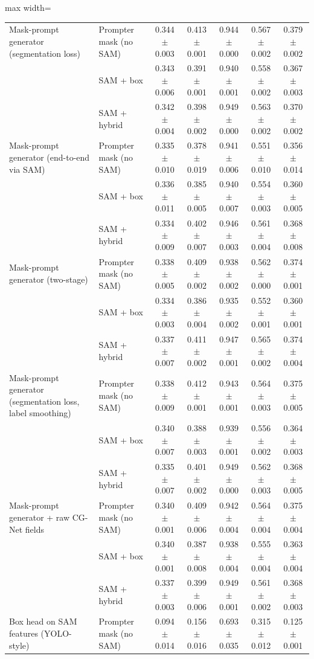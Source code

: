 \begin{table}[htbp]
\begin{adjustbox}{max width=\linewidth}
\begin{tabular}{llccccc}
\midrule
Mask-prompt generator (segmentation loss) & Prompter mask (no SAM) & 0.344$\pm$0.003 & 0.413$\pm$0.001 & 0.944$\pm$0.000 & 0.567$\pm$0.002 & 0.379$\pm$0.002 \\
 & SAM + box & 0.343$\pm$0.006 & 0.391$\pm$0.001 & 0.940$\pm$0.001 & 0.558$\pm$0.002 & 0.367$\pm$0.003 \\
 & SAM + hybrid & 0.342$\pm$0.004 & 0.398$\pm$0.002 & 0.949$\pm$0.000 & 0.563$\pm$0.002 & 0.370$\pm$0.002 \\
\midrule
Mask-prompt generator (end-to-end via SAM) & Prompter mask (no SAM) & 0.335$\pm$0.010 & 0.378$\pm$0.019 & 0.941$\pm$0.006 & 0.551$\pm$0.010 & 0.356$\pm$0.014 \\
 & SAM + box & 0.336$\pm$0.011 & 0.385$\pm$0.005 & 0.940$\pm$0.007 & 0.554$\pm$0.003 & 0.360$\pm$0.005 \\
 & SAM + hybrid & 0.334$\pm$0.009 & 0.402$\pm$0.007 & 0.946$\pm$0.003 & 0.561$\pm$0.004 & 0.368$\pm$0.008 \\
\midrule
Mask-prompt generator (two-stage) & Prompter mask (no SAM) & 0.338$\pm$0.005 & 0.409$\pm$0.002 & 0.938$\pm$0.002 & 0.562$\pm$0.000 & 0.374$\pm$0.001 \\
 & SAM + box & 0.334$\pm$0.003 & 0.386$\pm$0.004 & 0.935$\pm$0.002 & 0.552$\pm$0.001 & 0.360$\pm$0.001 \\
 & SAM + hybrid & 0.337$\pm$0.007 & 0.411$\pm$0.002 & 0.947$\pm$0.001 & 0.565$\pm$0.002 & 0.374$\pm$0.004 \\
\midrule
Mask-prompt generator (segmentation loss, label smoothing) & Prompter mask (no SAM) & 0.338$\pm$0.009 & 0.412$\pm$0.001 & 0.943$\pm$0.001 & 0.564$\pm$0.003 & 0.375$\pm$0.005 \\
 & SAM + box & 0.340$\pm$0.007 & 0.388$\pm$0.003 & 0.939$\pm$0.001 & 0.556$\pm$0.002 & 0.364$\pm$0.003 \\
 & SAM + hybrid & 0.335$\pm$0.007 & 0.401$\pm$0.002 & 0.949$\pm$0.000 & 0.562$\pm$0.003 & 0.368$\pm$0.005 \\
\midrule
Mask-prompt generator + raw CG-Net fields & Prompter mask (no SAM) & 0.340$\pm$0.001 & 0.409$\pm$0.006 & 0.942$\pm$0.004 & 0.564$\pm$0.004 & 0.375$\pm$0.004 \\
 & SAM + box & 0.340$\pm$0.001 & 0.387$\pm$0.008 & 0.938$\pm$0.004 & 0.555$\pm$0.004 & 0.363$\pm$0.004 \\
 & SAM + hybrid & 0.337$\pm$0.003 & 0.399$\pm$0.006 & 0.949$\pm$0.001 & 0.561$\pm$0.002 & 0.368$\pm$0.003 \\
\midrule
Box head on SAM features (YOLO-style) & Prompter mask (no SAM) & 0.094$\pm$0.014 & 0.156$\pm$0.016 & 0.693$\pm$0.035 & 0.315$\pm$0.012 & 0.125$\pm$0.001 \\

\end{tabular}
\end{adjustbox}
\end{table}
